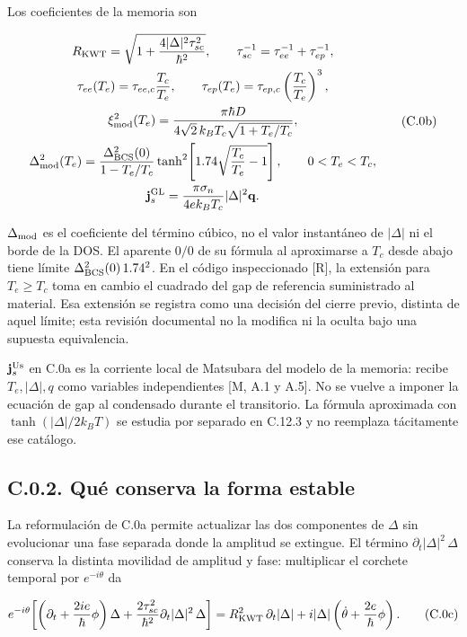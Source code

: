 \documentclass[
  spanish,
  10pt,
  a4paper,
]{article}
\begin{document}
Los coeficientes de la memoria son

\[
\begin{gathered}
R_{\rm KWT}=\sqrt{1+\frac{4|\Delta|^2\tau_{sc}^2}{\hbar^2}},
\qquad
\tau_{sc}^{-1}=\tau_{ee}^{-1}+\tau_{ep}^{-1},\\
\tau_{ee}(T_e)=\tau_{ee,c}\frac{T_c}{T_e},
\qquad
\tau_{ep}(T_e)=\tau_{ep,c}\left(\frac{T_c}{T_e}\right)^3,\\
\xi_{\rm mod}^2(T_e)
=\frac{\pi\hbar D}{4\sqrt2\,k_BT_c\sqrt{1+T_e/T_c}},\\
\Delta_{\rm mod}^2(T_e)
=\frac{\Delta_{\rm BCS}^2(0)}{1-T_e/T_c}
\tanh^2\!\left[1.74\sqrt{\frac{T_c}{T_e}-1}\right],
\qquad 0<T_e<T_c,\\
\mathbf j_s^{\rm GL}
=\frac{\pi\sigma_n}{4ek_BT_c}|\Delta|^2\mathbf q.
\end{gathered}
\tag{C.0b}
\]

\(\Delta_{\rm mod}\) es el coeficiente del término cúbico, no el valor
instantáneo de \(|\Delta|\) ni el borde de la DOS. El aparente \(0/0\)
de su fórmula al aproximarse a \(T_c\) desde abajo tiene límite
\(\Delta_{\rm BCS}^2(0)\,1.74^2\). En el código inspeccionado {[}R{]},
la extensión para \(T_e\geq T_c\) toma en cambio el cuadrado del gap de
referencia suministrado al material. Esa extensión se registra como una
decisión del cierre previo, distinta de aquel límite; esta revisión
documental no la modifica ni la oculta bajo una supuesta equivalencia.

\(\mathbf j_s^{\rm Us}\) en C.0a es la corriente local de Matsubara del
modelo de la memoria: recibe \(T_e,|\Delta|,q\) como variables
independientes {[}M, A.1 y A.5{]}. No se vuelve a imponer la ecuación de
gap al condensado durante el transitorio. La fórmula aproximada con
\(\tanh(|\Delta|/2k_BT)\) se estudia por separado en C.12.3 y no
reemplaza tácitamente ese catálogo.

\subsection{C.0.2. Qué conserva la forma
estable}\label{c.0.2.-quuxe9-conserva-la-forma-estable}

La reformulación de C.0a permite actualizar las dos componentes de
\(\Delta\) sin evolucionar una fase separada donde la amplitud se
extingue. El término \(\partial_t|\Delta|^2\,\Delta\) conserva la
distinta movilidad de amplitud y fase: multiplicar el corchete temporal
por \(e^{-i\theta}\) da

\[
e^{-i\theta}\!
\left[
\left(\partial_t+\frac{2ie}{\hbar}\phi\right)\Delta
+\frac{2\tau_{sc}^2}{\hbar^2}
\partial_t|\Delta|^2\,\Delta
\right]
=R_{\rm KWT}^2\,\partial_t|\Delta|
+i|\Delta|\left(\dot\theta+\frac{2e}{\hbar}\phi\right).
\tag{C.0c}
\]
\end{document}
